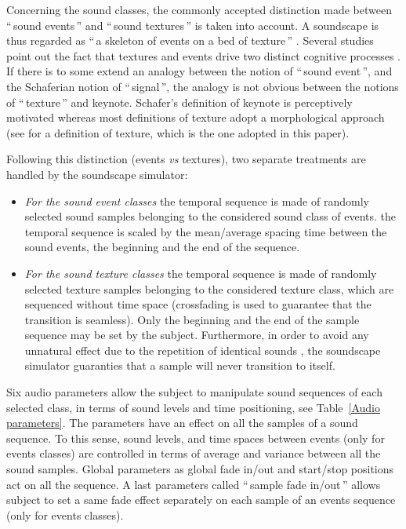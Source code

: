 \documentclass[12pt, titlepage, reqno]{article} %
\begin{document}
Concerning the sound classes, the commonly accepted distinction made between ``\,sound events\,'' and ``\,sound textures\,''  is taken into account. A  soundscape  is thus regarded as  ``\,a skeleton of events on a bed of texture\,'' \cite{nelken_ear_2013}. Several studies point out the fact that textures and events drive two distinct cognitive processes \cite{maffiolo_caracterisation_1999, saint-arnaud_classification_1995, mcdermott2013summary}. If there is to some extend an analogy between the  notion of ``\,sound event\,'', and the Schaferian notion of ``\,signal\,'', the analogy is not obvious between the notions of ``\,texture\,'' and keynote. Schafer's definition of keynote is perceptively motivated whereas most  definitions of texture  adopt a morphological approach (see \cite{saint-arnaud_classification_1995} for a definition of texture, which is the one adopted in this paper).

Following this distinction (events \textit{vs} textures), two separate treatments are handled by the soundscape simulator:

\begin{itemize}
\item \textit{For the sound event classes} the temporal sequence is made of randomly selected sound samples belonging to the considered sound class of events. the temporal sequence is scaled by the mean/average spacing time between the sound events, the beginning and the end of the sequence.
\item \textit{For the sound texture classes} the temporal sequence is made of randomly selected texture samples belonging to the considered texture class, which are sequenced without time space (crossfading is used to guarantee that the transition is seamless). Only the beginning and the end of the sample sequence may be set by the subject. Furthermore, in order to avoid any unnatural effect due to the repetition of identical sounds \cite{agus_rapid_2010}, the soundscape simulator guaranties that a sample will never transition to itself.
\end{itemize} 

Six audio parameters allow the subject to manipulate sound sequences of each selected class, in terms of sound levels and time positioning, see Table~\ref{Audio parameters}. The parameters have an effect on all the samples of a sound sequence. To this sense, sound levels, and time spaces between events (only for events classes) are controlled in terms of average and variance between all the sound samples. Global parameters as global fade in/out and start/stop positions act on all the sequence. A last parameters called ``\,sample fade in/out\,'' allows subject to set a same fade effect separately on each sample of an events sequence (only for events classes).
\end{document}
